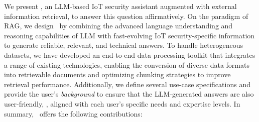 We present \chatiot, an LLM-based IoT security assistant augmented with external information retrieval, to answer this question affirmatively. 
On the paradigm of RAG, we design \chatiot\ by combining the advanced language understanding and reasoning capabilities of LLM with fast-evolving IoT security-specific information to generate reliable, relevant, and technical answers.
To handle heterogeneous datasets, we have developed an end-to-end data processing toolkit that integrates a range of existing technologies, enabling the conversion of diverse data formats into retrievable documents and optimizing chunking strategies to improve retrieval performance.
Additionally, we define several use-case specifications and provide the user's \textit{background} to ensure that the LLM-generated answers are also user-friendly, \aka, aligned with each user's specific needs and expertise levels.
In summary, \chatiot\ offers the following contributions:

